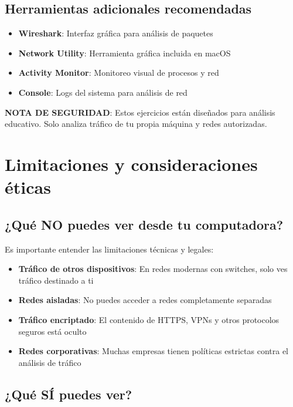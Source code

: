 \begin{itemize}
\subsection{Herramientas adicionales recomendadas}

\begin{itemize}
    \item \textbf{Wireshark}: Interfaz gráfica para análisis de paquetes
    \item \textbf{Network Utility}: Herramienta gráfica incluida en macOS
    \item \textbf{Activity Monitor}: Monitoreo visual de procesos y red
    \item \textbf{Console}: Logs del sistema para análisis de red
\end{itemize}

\textbf{NOTA DE SEGURIDAD}: Estos ejercicios están diseñados para análisis educativo. Solo analiza tráfico de tu propia máquina y redes autorizadas.

\section{Limitaciones y consideraciones éticas}

\subsection{¿Qué NO puedes ver desde tu computadora?}

Es importante entender las limitaciones técnicas y legales:

\begin{itemize}
    \item \textbf{Tráfico de otros dispositivos}: En redes modernas con switches, solo ves tráfico destinado a ti
    \item \textbf{Redes aisladas}: No puedes acceder a redes completamente separadas
    \item \textbf{Tráfico encriptado}: El contenido de HTTPS, VPNs y otros protocolos seguros está oculto
    \item \textbf{Redes corporativas}: Muchas empresas tienen políticas estrictas contra el análisis de tráfico
\end{itemize}

\subsection{¿Qué SÍ puedes ver?}


\end{itemize}
